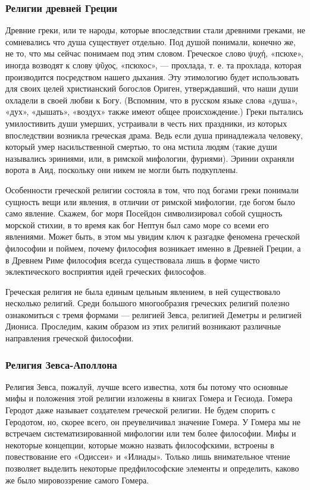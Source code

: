     \subsubsection{Религии древней Греции}	
    Древние греки, или те народы, которые впоследствии стали древними греками, не сомневались что душа существует отдельно. Под душой понимали, конечно же, не то, что мы сейчас понимаем под этим словом. Греческое слово ψυχή, «псюхе», иногда возводят к слову ψῦχος, «псюхос», — прохлада, т. е. та прохлада, которая производится посредством нашего дыхания. Эту этимологию будет использовать для своих целей христианский богослов Ориген, утверждавший, что наши души охладели в своей любви к Богу. (Вспомним, что в русском языке слова «душа», «дух», «дышать», «воздух» также имеют общее происхождение.) Греки пытались умилостивить души умерших, устраивали в честь них праздники, из которых впоследствии возникла греческая драма. Ведь если душа принадлежала человеку, который умер насильственной смертью, то она мстила людям (такие души назывались эриниями, или, в римской мифологии, фуриями). Эринии охраняли ворота в Аид, поскольку они никем не могли быть подкуплены. 
    
    \par Особенности греческой религии состояла в том, что под богами греки понимали сущность вещи или явления, в отличии от римской мифологии, где богом было само явление. Скажем, бог моря Посейдон символизировал собой сущность морской стихии, в то время как бог Нептун был само море со всеми его явлениями. Может быть, в этом мы увидим ключ к разгадке феномена греческой философии и поймем, почему философия возникает именно в Древней Греции, а в Древнем Риме философия всегда существовала лишь в форме чисто эклектического восприятия идей греческих философов.
    
    \par Греческая религия не была единым цельным явлением, в ней существовало несколько религий. Среди большого многообразия греческих религий полезно ознакомиться с тремя формами — религией Зевса, религией Деметры и религией Диониса. Проследим, каким образом из этих религий возникают различные направления греческой философии.
    
    \subsubsection{Религия Зевса-Аполлона}
    
    \par Религия Зевса, пожалуй, лучше всего известна, хотя бы потому что основные мифы и положения этой религии изложены в книгах Гомера и Гесиода. Гомера Геродот даже называет создателем греческой религии. Не будем спорить с Геродотом, но, скорее всего, он преувеличивал значение Гомера. У Гомера мы не встречаем систематизированной мифологии или тем более философии. Мифы и некоторые концепции, которые можно назвать философскими, встроены в повествование его «Одиссеи» и «Илиады». Только лишь внимательное чтение позволяет выделить некоторые предфилософские элементы и определить, каково же было мировоззрение самого Гомера.
    
